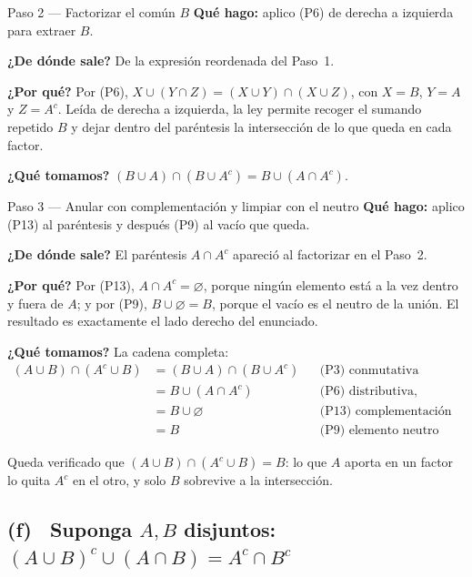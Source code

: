 \documentclass[11pt]{article}
\begin{document}
\begin{paso}{Paso 2 --- Factorizar el común $B$}
\textbf{Qué hago:} aplico (P6) de derecha a izquierda para extraer $B$.

\textbf{¿De dónde sale?} De la expresión reordenada del Paso~1.

\textbf{¿Por qué?} Por (P6), $X\cup(Y\cap Z)=(X\cup Y)\cap(X\cup Z)$, con $X=B$, $Y=A$ y
$Z=A^{c}$. Leída de derecha a izquierda, la ley permite recoger el sumando repetido $B$ y dejar
dentro del paréntesis la intersección de lo que queda en cada factor.

\textbf{¿Qué tomamos?} $(B\cup A)\cap(B\cup A^{c})=B\cup(A\cap A^{c})$.
\end{paso}

\begin{paso}{Paso 3 --- Anular con complementación y limpiar con el neutro}
\textbf{Qué hago:} aplico (P13) al paréntesis y después (P9) al vacío que queda.

\textbf{¿De dónde sale?} El paréntesis $A\cap A^{c}$ apareció al factorizar en el Paso~2.

\textbf{¿Por qué?} Por (P13), $A\cap A^{c}=\varnothing$, porque ningún elemento está a la vez
dentro y fuera de $A$; y por (P9), $B\cup\varnothing=B$, porque el vacío es el neutro de la
unión. El resultado es exactamente el lado derecho del enunciado.

\textbf{¿Qué tomamos?} La cadena completa:
\begin{align*}
(A\cup B)\cap(A^{c}\cup B)
&=(B\cup A)\cap(B\cup A^{c}) && \text{(P3) conmutativa}\\
&=B\cup(A\cap A^{c}) && \text{(P6) distributiva, factorizando}\\
&=B\cup\varnothing && \text{(P13) complementación}\\
&=B && \text{(P9) elemento neutro}
\end{align*}
\end{paso}

\begin{resp}
Queda verificado que $(A\cup B)\cap(A^{c}\cup B)=B$: lo que $A$ aporta en un factor lo quita
$A^{c}$ en el otro, y solo $B$ sobrevive a la intersección.
\end{resp}

\subsection*{(f) \ Suponga $A,B$ disjuntos: \ $(A\cup B)^{c}\cup(A\cap B)=A^{c}\cap B^{c}$}
\end{document}
